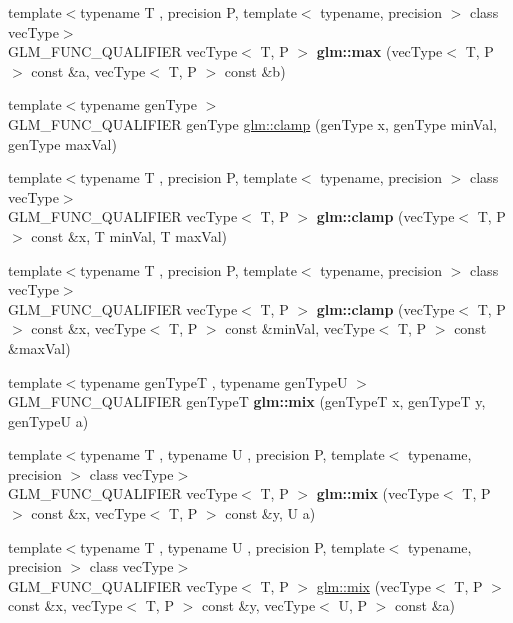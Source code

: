 \begin{DoxyCompactItemize}
{\footnotesize template$<$typename T , precision P, template$<$ typename, precision $>$ class vec\+Type$>$ }\\G\+L\+M\+\_\+\+F\+U\+N\+C\+\_\+\+Q\+U\+A\+L\+I\+F\+I\+ER vec\+Type$<$ T, P $>$ {\bfseries glm\+::max} (vec\+Type$<$ T, P $>$ const \&a, vec\+Type$<$ T, P $>$ const \&b)
\item 
{\footnotesize template$<$typename gen\+Type $>$ }\\G\+L\+M\+\_\+\+F\+U\+N\+C\+\_\+\+Q\+U\+A\+L\+I\+F\+I\+ER gen\+Type \hyperlink{group__core__func__common_ga93bce26c7d80d30a62f5c508f8498a6c}{glm\+::clamp} (gen\+Type x, gen\+Type min\+Val, gen\+Type max\+Val)
\item 
{\footnotesize template$<$typename T , precision P, template$<$ typename, precision $>$ class vec\+Type$>$ }\\G\+L\+M\+\_\+\+F\+U\+N\+C\+\_\+\+Q\+U\+A\+L\+I\+F\+I\+ER vec\+Type$<$ T, P $>$ {\bfseries glm\+::clamp} (vec\+Type$<$ T, P $>$ const \&x, T min\+Val, T max\+Val)
\item 
{\footnotesize template$<$typename T , precision P, template$<$ typename, precision $>$ class vec\+Type$>$ }\\G\+L\+M\+\_\+\+F\+U\+N\+C\+\_\+\+Q\+U\+A\+L\+I\+F\+I\+ER vec\+Type$<$ T, P $>$ {\bfseries glm\+::clamp} (vec\+Type$<$ T, P $>$ const \&x, vec\+Type$<$ T, P $>$ const \&min\+Val, vec\+Type$<$ T, P $>$ const \&max\+Val)
\item 
{\footnotesize template$<$typename gen\+TypeT , typename gen\+TypeU $>$ }\\G\+L\+M\+\_\+\+F\+U\+N\+C\+\_\+\+Q\+U\+A\+L\+I\+F\+I\+ER gen\+TypeT {\bfseries glm\+::mix} (gen\+TypeT x, gen\+TypeT y, gen\+TypeU a)
\item 
{\footnotesize template$<$typename T , typename U , precision P, template$<$ typename, precision $>$ class vec\+Type$>$ }\\G\+L\+M\+\_\+\+F\+U\+N\+C\+\_\+\+Q\+U\+A\+L\+I\+F\+I\+ER vec\+Type$<$ T, P $>$ {\bfseries glm\+::mix} (vec\+Type$<$ T, P $>$ const \&x, vec\+Type$<$ T, P $>$ const \&y, U a)
\item 
{\footnotesize template$<$typename T , typename U , precision P, template$<$ typename, precision $>$ class vec\+Type$>$ }\\G\+L\+M\+\_\+\+F\+U\+N\+C\+\_\+\+Q\+U\+A\+L\+I\+F\+I\+ER vec\+Type$<$ T, P $>$ \hyperlink{group__core__func__common_gadccbaffe46f369cf1a96b2aef92cbfdd}{glm\+::mix} (vec\+Type$<$ T, P $>$ const \&x, vec\+Type$<$ T, P $>$ const \&y, vec\+Type$<$ U, P $>$ const \&a)
\item 

\end{DoxyCompactItemize}
